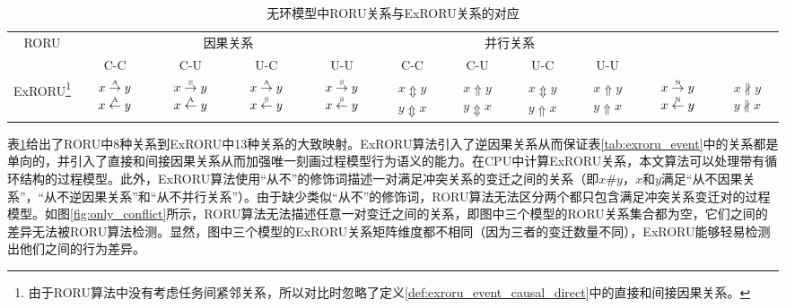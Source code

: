 \begin{table}[htbp]
  \centering
  \begin{minipage}[t]{0.9\textwidth}
    \setlength\tabcolsep{4pt}
    \caption{无环模型中RORU关系与ExRORU关系的对应}
    \label{tab:corr_roru_exroru}
    \begin{tabular}{|c|c|c|c|c|c|c|c|c|c|c|}\hline
      \multicolumn{1}{|c|}{\multirow{2}{*}{RORU}} & \multicolumn{4}{c|}{因果关系} & \multicolumn{4}{c|}{并行关系} & \multicolumn{1}{c|}{\multirow{2}{*}{}} & \multicolumn{1}{c|}{\multirow{2}{*}{}} \\ \cline{2-9}
      \multicolumn{1}{|c|}{} & C-C & C-U & U-C & U-U & C-C & C-U & U-C & U-U & \multicolumn{1}{c|}{} & \multicolumn{1}{c|}{}\\ \hline
      ExRORU\footnote{由于RORU算法中没有考虑任务间紧邻关系，所以对比时忽略了定义\ref{def:exroru_event_causal_direct}中的直接和间接因果关系。} & \tabincell{c}{$x\overset{\text{\tiny{A}}}{\rightarrow} y$\\$x\overset{\text{\tiny{A}}}{\leftarrow} y$} & \tabincell{c}{$x\overset{\text{\tiny{S}}}{\rightarrow} y$\\$x\overset{\text{\tiny{A}}}{\leftarrow} y$} & \tabincell{c}{$x\overset{\text{\tiny{A}}}{\rightarrow} y$\\$x\overset{\text{\tiny{S}}}{\leftarrow} y$} & \tabincell{c}{$x\overset{\text{\tiny{S}}}{\rightarrow} y$\\$x\overset{\text{\tiny{S}}}{\leftarrow} y$} & \tabincell{c}{$x\Updownarrow y$\\$y\Updownarrow x$} & \tabincell{c}{$x\Uparrow y$\\$y\Updownarrow x$} & \tabincell{c}{$x\Updownarrow y$\\$y\Uparrow x$} & \tabincell{c}{$x\Uparrow y$\\$y\Uparrow x$} & \tabincell{c}{$x\overset{\text{\tiny{N}}}{\rightarrow} y$\\$x\overset{\text{\tiny{N}}}{\leftarrow} y$} & \tabincell{c}{$x\nparallel y$\\$y\nparallel x$}\\ \hline
    \end{tabular}
  \end{minipage}
\end{table}

表\ref{tab:corr_roru_exroru}给出了RORU中8种关系到ExRORU中13种关系的大致映射。ExRORU算法引入了逆因果关系从而保证表\ref{tab:exroru_event}中的关系都是单向的，并引入了直接和间接因果关系从而加强唯一刻画过程模型行为语义的能力。在CPU中计算ExRORU关系，本文算法可以处理带有循环结构的过程模型。此外，ExRORU算法使用“从不”的修饰词描述一对满足冲突关系的变迁之间的关系（即$x\#y$，$x$和$y$满足“从不因果关系”，“从不逆因果关系”和“从不并行关系”）。由于缺少类似“从不”的修饰词，RORU算法无法区分两个都只包含满足冲突关系变迁对的过程模型。如图\ref{fig:only_conflict}所示，RORU算法无法描述任意一对变迁之间的关系，即图中三个模型的RORU关系集合都为空，它们之间的差异无法被RORU算法检测。显然，图中三个模型的ExRORU关系矩阵维度都不相同（因为三者的变迁数量不同），ExRORU能够轻易检测出他们之间的行为差异。

